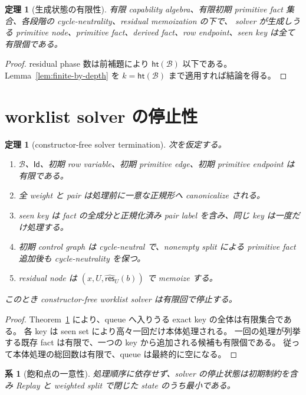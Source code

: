 \documentclass[uplatex,dvipdfmx,a4paper,10.5pt]{jsarticle}
\theoremstyle{jpplain}
\newtheorem{theorem}[definition]{定理}
\newtheorem{corollary}[definition]{系}
\newcommand{\Caps}{\mathcal B}
\newcommand{\Id}{\mathsf{Id}}
\newcommand{\respair}{\widehat{\mathsf{res}}}
\newcommand{\capheight}{\mathsf{ht}}
\begin{document}
\begin{theorem}[生成状態の有限性]
\label{thm:state-finite}
有限 capability algebra、有限初期 primitive fact 集合、各段階の cycle-neutrality、residual memoization の下で、
solver が生成しうる primitive node、primitive fact、derived fact、row endpoint、seen key は全て有限個である。
\end{theorem}

\begin{proof}
residual phase 数は前補題により $\capheight(\Caps)$ 以下である。
Lemma~\ref{lem:finite-by-depth} を $k=\capheight(\Caps)$ まで適用すれば結論を得る。
\end{proof}

\section{worklist solver の停止性}

\begin{theorem}[constructor-free solver termination]
\label{thm:termination}
次を仮定する。

\begin{enumerate}
  \item $\Caps$、$\Id$、初期 row variable、初期 primitive edge、初期 primitive endpoint は有限である。
  \item 全 weight と pair は処理前に一意な正規形へ canonicalize される。
  \item seen key は fact の全成分と正規化済み pair label を含み、同じ key は一度だけ処理する。
  \item 初期 control graph は cycle-neutral で、nonempty split による primitive fact 追加後も cycle-neutrality を保つ。
  \item residual node は $(x,U,\respair_U(b))$ で memoize する。
\end{enumerate}

このとき constructor-free worklist solver は有限回で停止する。
\end{theorem}

\begin{proof}
Theorem~\ref{thm:state-finite} により、queue へ入りうる exact key の全体は有限集合である。
各 key は seen set により高々一回だけ本体処理される。
一回の処理が列挙する既存 fact は有限で、一つの key から追加される候補も有限個である。
従って本体処理の総回数は有限で、queue は最終的に空になる。
\end{proof}

\begin{corollary}[飽和点の一意性]
処理順序に依存せず、solver の停止状態は初期制約を含み Replay と weighted split で閉じた state のうち最小である。
\end{corollary}
\end{document}
